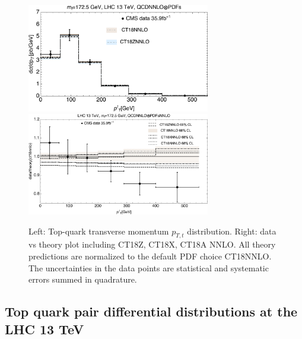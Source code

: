 %
\begin{figure}[tb]
\begin{center}
\includegraphics[width=8cm]{./fig/ttbar/CMS13-pT-top-CT18NNLO-mt172p5_ect.pdf}
\includegraphics[width=8cm]{./fig/ttbar/CMS13-pt-top-nnlo-ct18-zaxnnlo-mt172p5_ect.pdf}
\caption{Left: Top-quark transverse momentum $p_{T,t}$ distribution. 
Right: data vs theory plot including CT18Z, CT18X, CT18A NNLO. All theory predictions are normalized to the default PDF choice CT18NNLO.
The uncertainties in the data points are statistical and systematic errors summed in quadrature.}
\label{pTt}
\end{center}
\end{figure}

\subsection{Top quark pair differential distributions at the LHC 13 TeV}
\label{sec:tt13}

